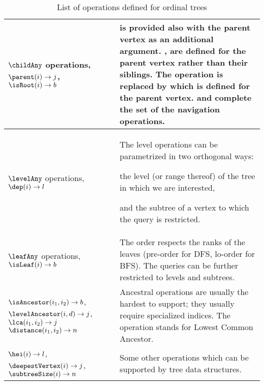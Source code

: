 \begin{table}
\begin{tabularx}{\textwidth}{|L{0.7}|J{1.3}|}
		$\childAny$ operations, \newline
		$\parent(i) \rightarrow j$, \newline
		$\isRoot(i) \rightarrow b$
		& \childSelect{} is provided also with the parent vertex as an additional argument.
		\childFirst{}, \childLast{} are defined for the parent vertex rather than their siblings.
		The operation \childSize{} is replaced by \degree{} which is defined for the parent vertex.
		\parent{} and \isRoot{} complete the set of the navigation operations.\\ \hline
	
		$\levelAny$ operations, \newline
		$\dep(i) \rightarrow l$
		& The level operations can be parametrized in two orthogonal ways:
		\begin{iteminline}
			\item the level (or range thereof) of the tree in which we are interested,
			\item and the subtree of a vertex to which the query is restricted.
		\end{iteminline} \\ \hline
		
		$\leafAny$ operations, \newline
		$\isLeaf(i) \rightarrow b$
		& The order respects the ranks of the leaves (pre-order for DFS, lo-order for BFS).
		The queries can be further restricted to levels and subtrees.\\ \hline \hline
		
		$\isAncestor(i_1, i_2) \rightarrow b$, \newline
		$\levelAncestor(i, d) \rightarrow j$, \newline
		$\lca(i_1, i_2) \rightarrow j$
		$\distance(i_1, i_2) \rightarrow n$
		& Ancestral operations are usually the hardest to support; they usually require specialized indices.
		The operation \lca{} stands for Lowest Common Ancestor. \\ \hline
		
		$\hei(i) \rightarrow l$, \newline
		$\deepestVertex(i) \rightarrow j$, \newline
		$\subtreeSize(i) \rightarrow n$
		& Some other operations which can be supported by tree data structures. \\ \hline
	\end{tabularx}
	\caption{List of operations defined for ordinal trees}
	\label{tab:list-ops}
\end{table}

